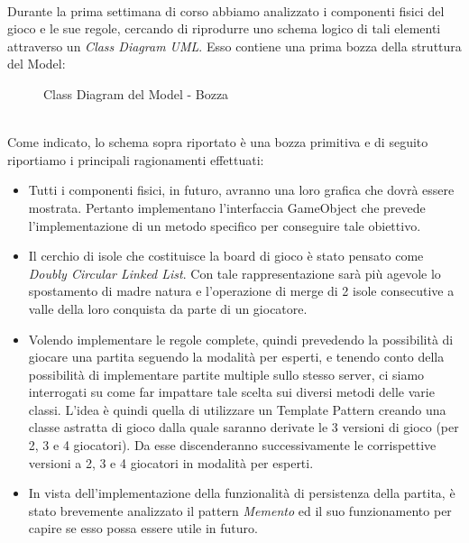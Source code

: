 \documentclass[a4paper, 12pt]{article}
\begin{document}
	\paragraph{}
	Durante la prima settimana di corso abbiamo analizzato i componenti fisici del gioco e le sue regole, cercando di riprodurre uno schema logico di tali elementi attraverso un \emph{Class Diagram UML}. Esso contiene una prima bozza della struttura del Model:\\
	\begin{figure}[h]
		\centering
		\def\svgwidth{\columnwidth}
		\resizebox{\linewidth}{!}{}
		\caption{Class Diagram del Model - Bozza}
	\end{figure}\\
	Come indicato, lo schema sopra riportato è una bozza primitiva e di seguito riportiamo i principali ragionamenti effettuati:\\
	\begin{itemize}
		\setlength{\parskip}{0pt}
		\setlength{\parsep}{0pt}
		
		\item Tutti i componenti fisici, in futuro, avranno una loro grafica che dovrà essere mostrata. Pertanto implementano l'interfaccia GameObject che prevede l'implementazione di un metodo specifico per conseguire tale obiettivo.
		\item Il cerchio di isole che costituisce la board di gioco è stato pensato come \emph{Doubly Circular Linked List}\cite{circularDoublyLinkedList}. Con tale rappresentazione sarà più agevole lo spostamento di madre natura e l'operazione di merge di 2 isole consecutive a valle della loro conquista da parte di un giocatore.
		\item Volendo implementare le regole complete, quindi prevedendo la possibilità di giocare una partita seguendo la modalità per esperti, e tenendo conto della possibilità di implementare partite multiple sullo stesso server, ci siamo interrogati su come far impattare tale scelta sui diversi metodi delle varie classi. L'idea è quindi quella di utilizzare un Template Pattern creando una classe astratta di gioco dalla quale saranno derivate le 3 versioni di gioco (per 2, 3 e 4 giocatori). Da esse discenderanno successivamente le corrispettive versioni a 2, 3 e 4 giocatori in modalità per esperti.
		\item In vista dell'implementazione della funzionalità di persistenza della partita, è stato brevemente analizzato il pattern \emph{Memento} ed il suo funzionamento per capire se esso possa essere utile in futuro.
	\end{itemize}
\end{document}
